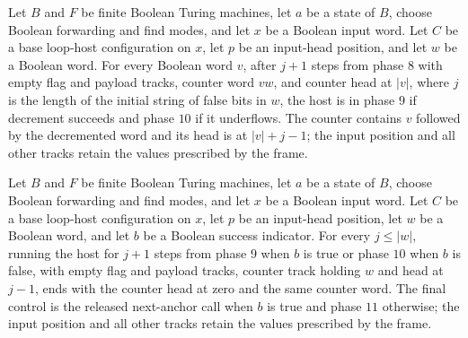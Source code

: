 \begin{lemma}
\label{Turing.FinTM.loopHost_borrow_run}
\leanok
{}
Let $B$ and $F$ be finite Boolean Turing machines, let $a$ be a state of $B$, choose
Boolean forwarding and find modes, and let $x$ be a Boolean input word. Let $C$ be a
base loop-host configuration on $x$, let $p$ be an input-head position, and let $w$ be a
Boolean word. For every Boolean word $v$, after $j+1$ steps from phase $8$ with empty
flag and payload tracks, counter word $v w$, and counter head at $|v|$, where $j$ is the
length of the initial string of false bits in $w$, the host is in phase $9$ if decrement
succeeds and phase $10$ if it underflows. The counter contains $v$ followed by the
decremented word and its head is at $|v|+j-1$; the input position and all other tracks
retain the values prescribed by the frame.
\end{lemma}

\begin{lemma}
\label{Turing.FinTM.loopHost_borrow_rewind}
\leanok
{}
Let $B$ and $F$ be finite Boolean Turing machines, let $a$ be a state of $B$, choose
Boolean forwarding and find modes, and let $x$ be a Boolean input word. Let $C$ be a
base loop-host configuration on $x$, let $p$ be an input-head position, let $w$ be a
Boolean word, and let $b$ be a Boolean success indicator. For every $j\le |w|$, running
the host for $j+1$ steps from phase $9$ when $b$ is true or phase $10$ when $b$ is
false, with empty flag and payload tracks, counter track holding $w$ and head at $j-1$,
ends with the counter head at zero and the same counter word. The final control is the
released next-anchor call when $b$ is true and phase $11$ otherwise; the input position
and all other tracks retain the values prescribed by the frame.
\end{lemma}

